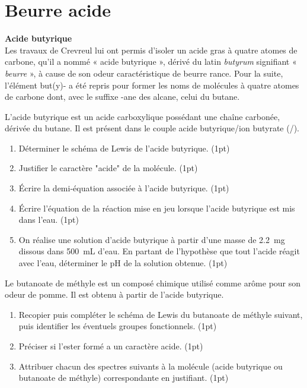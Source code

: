 \documentclass[a4paper,11pt,fleqn]{article}%
\begin{document}
\maketitle

\section{Beurre acide}
\noindent \colorbox{red!10}{\begin{minipage}{.98\linewidth}
	\small
	\textbf{Acide butyrique}\\
	Les travaux de Crevreul lui ont permis d’isoler un acide gras à quatre atomes de carbone, qu’il a nommé « acide butyrique », dérivé du latin \textit{butyrum} signifiant « \textit{beurre} », à cause de son odeur caractéristique de beurre rance. Pour la suite, l’élément but(y)- a été repris pour former les noms de molécules à quatre atomes de carbone dont, avec le suffixe -ane des alcane, celui du butane.\\
\end{minipage}}

L’acide butyrique est un acide carboxylique possédant une chaîne carbonée, dérivée du butane. Il est présent dans le couple acide butyrique/ion butyrate (/).
\begin{enumerate}
	\item Déterminer le schéma de Lewis de l’acide butyrique. (1pt)
	\item Justifier le caractère "acide" de la molécule. (1pt)
	\item Écrire la demi-équation associée à l'acide butyrique. (1pt)
	\item Écrire l'équation de la réaction mise en jeu lorsque l'acide butyrique est mis dans l'eau. (1pt)
	\item On réalise une solution d'acide butyrique à partir d'une masse de \SI{2,2}{\milli\gram} dissous dans \SI{500}{\milli\liter} d'eau. En partant de l'hypothèse que tout l'acide réagit avec l'eau, déterminer le pH de la solution obtenue. (1pt)
\end{enumerate}
Le butanoate de méthyle  est un composé chimique utilisé comme arôme pour son odeur de pomme. Il est obtenu à partir de l’acide butyrique.
\begin{enumerate}[resume]
	\item Recopier puis compléter le schéma de Lewis du butanoate de méthyle suivant, puis identifier les éventuels groupes fonctionnels. (1pt)
	\item Préciser si l’ester formé a un caractère acide. (1pt)
	\item Attribuer chacun des spectres suivants à la molécule (acide butyrique ou butanoate de méthyle) correspondante en justifiant. (1pt)
\end{enumerate}
\end{document}
